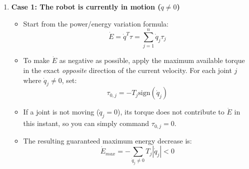 \documentclass[11pt,a4paper]{article}
\begin{document}
\begin{enumerate}
    \item \textbf{Case 1: The robot is currently in motion ($\dot{q} \neq 0$)}
    \begin{itemize}
        \item Start from the power/energy variation formula: 
        \begin{equation}
            \dot{E} = \dot{q}^T \tau = \sum_{j=1}^n \dot{q}_j \tau_j
        \end{equation}
        \item To make $\dot{E}$ as negative as possible, apply the maximum available torque in the exact \emph{opposite} direction of the current velocity. For each joint $j$ where $\dot{q}_j \neq 0$, set:
        \begin{equation}
            \tau_{0,j} = -T_j \text{sign}(\dot{q}_j)
        \end{equation}
        \item If a joint is not moving ($\dot{q}_j = 0$), its torque does not contribute to $\dot{E}$ in this instant, so you can simply command $\tau_{0,j} = 0$.
        \item The resulting guaranteed maximum energy decrease is:
        \begin{equation}
            \dot{E}_{max} = -\sum_{\dot{q}_j \neq 0} T_j |\dot{q}_j| < 0
        \end{equation}
    \end{itemize}


\end{enumerate}
\end{document}
